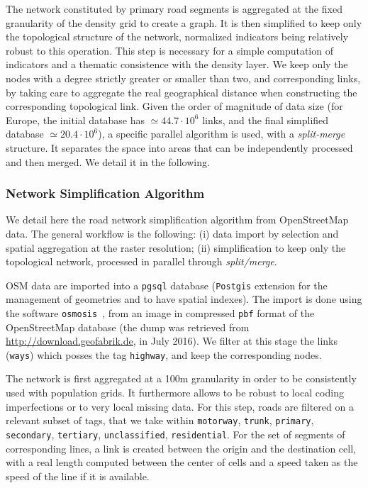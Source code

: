 \documentclass[11pt]{article}
\begin{document}
The network constituted by primary road segments is aggregated at the fixed granularity of the density grid to create a graph. It is then simplified to keep only the topological structure of the network, normalized indicators being relatively robust to this operation. This step is necessary for a simple computation of indicators and a thematic consistence with the density layer. We keep only the nodes with a degree strictly greater or smaller than two, and corresponding links, by taking care to aggregate the real geographical distance when constructing the corresponding topological link. Given the order of magnitude of data size (for Europe, the initial database has $\simeq 44.7\cdot 10^6$ links, and the final simplified database $\simeq 20.4\cdot 10^6$), a specific parallel algorithm is used, with a \emph{split-merge} structure. It separates the space into areas that can be independently processed and then merged. We detail it in the following.


\subsubsection{Network Simplification Algorithm}


We detail here the road network simplification algorithm from OpenStreetMap data. The general workflow is the following: (i) data import by selection and spatial aggregation at the raster resolution; (ii) simplification to keep only the topological network, processed in parallel through \emph{split/merge}.

OSM data are imported into a \texttt{pgsql} database (\texttt{Postgis} extension for the management of geometries and to have spatial indexes). The import is done using the software \texttt{osmosis}~\cite{osmosis}, from an image in compressed \texttt{pbf} format of the OpenStreetMap database (the dump was retrieved from \url{http://download.geofabrik.de}, in July 2016). We filter at this stage the links (\texttt{ways}) which posses the tag \texttt{highway}, and keep the corresponding nodes.


The network is first aggregated at a 100m granularity in order to be consistently used with population grids. It furthermore allows to be robust to local coding imperfections or to very local missing data. For this step, roads are filtered on a relevant subset of tags, that we take within \texttt{motorway}, \texttt{trunk}, \texttt{primary}, \texttt{secondary}, \texttt{tertiary}, \texttt{unclassified}, \texttt{residential}. For the set of segments of corresponding lines, a link is created between the origin and the destination cell, with a real length computed between the center of cells and a speed taken as the speed of the line if it is available.
\end{document}

